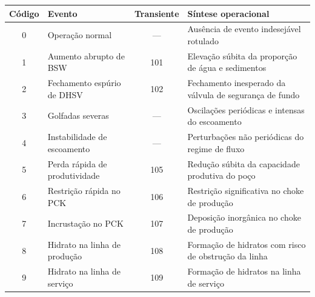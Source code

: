\begin{tabularx}{\textwidth}{@{}c p{3.6cm}c X@{}}
\toprule
Código & Evento & Transiente & Síntese operacional \\
\midrule
0 & Operação normal & --- & Ausência de evento indesejável rotulado \\
1 & Aumento abrupto de BSW & 101 & Elevação súbita da proporção de água e sedimentos \\
2 & Fechamento espúrio de DHSV & 102 & Fechamento inesperado da válvula de segurança de fundo \\
3 & Golfadas severas & --- & Oscilações periódicas e intensas do escoamento \\
4 & Instabilidade de escoamento & --- & Perturbações não periódicas do regime de fluxo \\
5 & Perda rápida de produtividade & 105 & Redução súbita da capacidade produtiva do poço \\
6 & Restrição rápida no PCK & 106 & Restrição significativa no choke de produção \\
7 & Incrustação no PCK & 107 & Deposição inorgânica no choke de produção \\
8 & Hidrato na linha de produção & 108 & Formação de hidratos com risco de obstrução da linha \\
9 & Hidrato na linha de serviço & 109 & Formação de hidratos na linha de serviço \\
\bottomrule
\end{tabularx}
